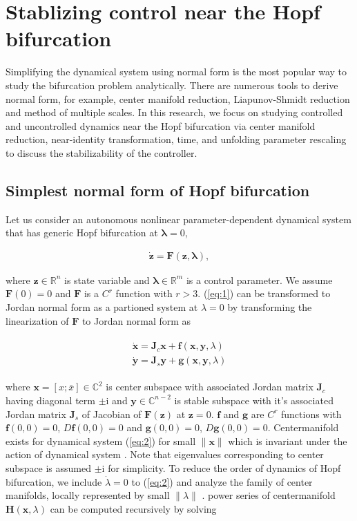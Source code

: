 \documentclass[openacc]{rsproca_new}%
\def\real{\mathbb{R}}
\def\complex{\mathbb{C}}
\def\vec#1{\ensuremath{\mathbf{#1}}}
\newcommand{\Eref}[1]{(\ref{#1})}
\begin{document}
\section{Stablizing control near the Hopf bifurcation}\label{SNH}
Simplifying the dynamical system using normal form is the most popular way to study the bifurcation problem analytically. There are numerous tools to derive normal form, for example, center manifold reduction, Liapunov-Shmidt reduction and method of multiple scales. In this research, we focus on studying controlled and uncontrolled dynamics near the Hopf bifurcation via center manifold reduction, near-identity transformation, time, and unfolding parameter rescaling to discuss the stabilizability of the controller.

\subsection{Simplest normal form of Hopf bifurcation}\label{SNF}
Let us consider an autonomous nonlinear parameter-dependent dynamical system that has generic Hopf bifurcation at \(\vec{\lambda}=0\),

\begin{align}\label{eq:1}
    \dot{\vec{z}} =\vec{F}(\vec{z},\vec{\lambda}),
\end{align}


\noindent where \(\vec{z}\in \real^n\) is state variable and \(\vec{\lambda}\in\real^m\) is a control parameter. We assume \(\vec{F}(0)=0\) and \(\vec{F}\) is a \(C^r\) function with \(r>3\).
\Eref{eq:1} can be transformed to Jordan normal form as a partioned system at \(\lambda=0\) by transforming the linearization of \(\vec{F}\) to Jordan normal form as


\begin{align}\label{eq:2}
  \begin{split}
    \dot{\vec{x}} =\vec{J}_c \vec{x} + \vec{f}(\vec{x},\vec{y},\lambda)\\
    \dot{\vec{y}} =\vec{J}_s \vec{y} +\vec{g}(\vec{x},\vec{y},\lambda)
  \end{split}
\end{align}

\noindent where \(\vec{x}=[x;\bar{x}]\in \complex^2\) is center subspace with associated Jordan matrix \(\vec{J}_c\) having diagonal term \(\pm\textrm{i}\) and \(\vec{y}\in \complex^{n-2}\) is stable subspace with it's associated Jordan matrix \(\vec{J}_s\) of Jacobian of \(\vec{F}(\vec{z})\) at \(\vec{z}=0\). \(\vec{f}\) and \(\vec{g}\) are \(C^r\) functions with \(\vec{f}(0,0)=0\), \(D\vec{f}(0,0)=0\) and \(\vec{g}(0,0
)=0\), \(D\vec{g}(0,0)=0\). Centermanifold exists for dynamical system \Eref{eq:2} for small  \(\|\vec{x}\|\) which is invariant under the action of dynamical system \cite{carr2012applications}. Note that eigenvalues corresponding to center subspace is assumed \(\pm\textrm{i}\) for simplicity. To reduce the order of dynamics of Hopf bifurcation, we include \(\dot\lambda=0\) to \Eref{eq:2} and analyze the family of center manifolds, locally represented by small \(\|\lambda\|\)  \cite{kuznetsov2013elements}. power series of centermanifold \(\vec{H}(\vec{x},\lambda)\) can be computed recursively by solving
\end{document}

